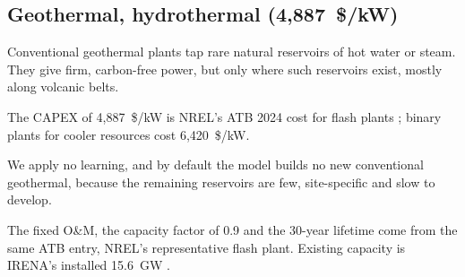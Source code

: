 \subsection{Geothermal, hydrothermal (4,887~\$/kW)}\label{sec:geothermal}
Conventional geothermal plants tap rare natural reservoirs of hot water or steam.
They give firm, carbon-free power, but only where such reservoirs exist, mostly along volcanic belts.

The CAPEX of 4,887~\$/kW is NREL's ATB 2024 cost for flash plants \citep{atb2024}; binary plants for cooler resources cost 6,420~\$/kW.

We apply no learning, and by default the model builds no new conventional geothermal, because the remaining reservoirs are few, site-specific and slow to develop.

The fixed O\&M, the capacity factor of 0.9 and the 30-year lifetime come from the same ATB entry, NREL's representative flash plant.
Existing capacity is IRENA's installed 15.6~GW \citep{irenastats}.
